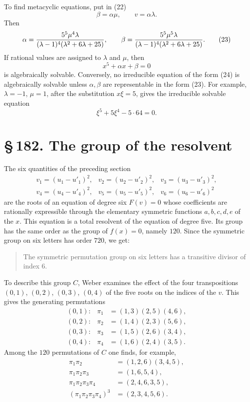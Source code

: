 \documentclass[11pt]{article}
\providecommand{\sect}[2]{\section*{\S\,#1. #2}}
\begin{document}
To find metacyclic equations, put in (22)
\[
  \beta=\alpha\mu,
  \qquad v=\alpha\lambda.
\]
Then
\[
  \alpha={5^5\mu^4\lambda\over(\lambda-1)^4(\lambda^2+6\lambda+25)},
  \qquad
  \beta={5^5\mu^5\lambda\over(\lambda-1)^4(\lambda^2+6\lambda+25)}. \tag{23}
\]
If rational values are assigned to $\lambda$ and $\mu$, then
\[
  x^5+\alpha x+
\beta=0                                                     \tag{24}
\]
is algebraically solvable. Conversely, no irreducible equation of the form (24) is algebraically solvable unless $\alpha,
\beta$ are representable in the form (23). For example, $\lambda=-1$, $\mu=1$, after the substitution $x\xi=5$, gives the irreducible solvable equation
\[
  \xi^5+5\xi^4-5\cdot64=0.
\]

\sect{182}{The group of the resolvent}

The six quantities of the preceding section
\[
\begin{array}{lll}
 v_1=(u_1-u'_1)^2,& v_2=(u_2-u'_2)^2,& v_3=(u_3-u'_3)^2,\\
 v_4=(u_4-u'_4)^2,& v_5=(u_5-u'_5)^2,& v_6=(u_6-u'_6)^2
\end{array}                                                       \tag{1}
\]
are the roots of an equation of degree six $F(v)=0$ whose coefficients are rationally expressible through the elementary symmetric functions $a,b,c,d,e$ of the $x$. This equation is a total resolvent of the equation of degree five. Its group has the same order as the group of $f(x)=0$, namely $120$. Since the symmetric group on six letters has order $720$, we get:
\begin{quote}
The symmetric permutation group on six letters has a transitive divisor of index $6$.
\end{quote}

To describe this group $C$, Weber examines the effect of the four transpositions $(0,1)$, $(0,2)$, $(0,3)$, $(0,4)$ of the five roots on the indices of the $v$. This gives the generating permutations
\[
\begin{array}{rcl}
(0,1):&\pi_1&=(1,3)(2,5)(4,6),\\
(0,2):&\pi_2&=(1,4)(2,3)(5,6),\\
(0,3):&\pi_3&=(1,5)(2,6)(3,4),\\
(0,4):&\pi_4&=(1,6)(2,4)(3,5).
\end{array}
\]
Among the $120$ permutations of $C$ one finds, for example,
\[
\begin{aligned}
\pi_1\pi_2&=(1,2,6)(3,4,5),\\
\pi_1\pi_2\pi_3&=(1,6,5,4),\\
\pi_1\pi_2\pi_3\pi_4&=(2,4,6,3,5),\\
(\pi_1\pi_2\pi_3\pi_4)^3&=(2,3,4,5,6).
\end{aligned}
\]
\end{document}
